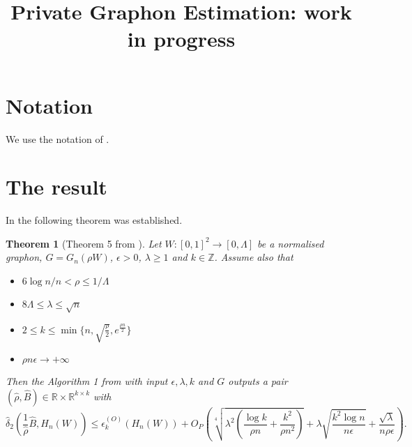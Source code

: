 \documentclass[12pt]{article}
\newtheorem{theorem}{Theorem}[section]
\begin{document}
\title{Private Graphon Estimation: work in progress}
\date{}




\maketitle




\section{Notation}
We use the notation of \cite{Borgs2015}.
\section{The result}

In \cite{Borgs2015} the following theorem was established. 

\begin{theorem}[Theorem 5 from \cite{Borgs2015}] 
Let $W: [0,1]^2 \rightarrow [0,\Lambda]$ be a normalised graphon, $G=G_n(\rho W)$, $ \epsilon>0$, $\lambda \geq 1$ and $k \in \mathbb{Z}$. Assume also that
 \begin{itemize}
\item  $6 \log n/n<\rho \leq 1/\Lambda$
\item $8 \Lambda \leq \lambda  \leq \sqrt{n}$
\item $2 \leq k \leq \min \{n,\sqrt{\frac{\rho}{2}},e^{\frac{\rho n}{2}}\}$
\item $\rho n \epsilon \rightarrow + \infty$
\end{itemize} 
Then the Algorithm 1 from \cite{Borgs2015} with input $\epsilon,\lambda,k$ and $G$ outputs a pair $(\hat{\rho},\hat{B}) \in \mathbb{R} \times \mathbb{R}^{k \times k}$ with
\begin{equation}
\hat{\delta}_2\left(\frac{1}{\hat{\rho}}\hat{B},H_n(W)\right) \leq \hat{\epsilon}_k^{(O)}(H_n(W))+O_P\left(\sqrt[4]{\lambda^2(\frac{ \log k}{\rho n}+\frac{k^2}{\rho n^2})}+\lambda \sqrt{\frac{k^2 \log n}{n \epsilon}}+\frac{\sqrt{\lambda}}{n \rho \epsilon} \right).
\end{equation}
\end{theorem}
\end{document}
